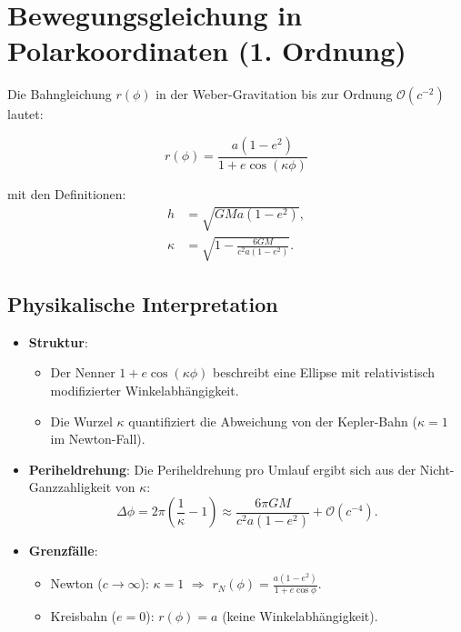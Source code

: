\newpage
\section{Bewegungsgleichung in Polarkoordinaten (1. Ordnung)}
Die Bahngleichung \(r(\phi)\) in der Weber-Gravitation bis zur Ordnung \(\mathcal{O}(c^{-2})\) lautet:

\begin{equation}
r(\phi) = \frac{a(1 - e^2)}{1 + e \cos\left(\kappa\phi\right)}
\end{equation}

\noindent mit den Definitionen:
\begin{align*}
h &= \sqrt{GMa(1 - e^2)}, \\
\kappa &= \sqrt{1 - \frac{6GM}{c^2a(1 - e^2)}}.
\end{align*}

\subsection*{Physikalische Interpretation}
\begin{itemize}
    \item \textbf{Struktur}: 
        \begin{itemize}
            \item Der Nenner \(1 + e \cos(\kappa\phi)\) beschreibt eine Ellipse mit relativistisch\\modifizierter Winkelabhängigkeit.
            \item Die Wurzel \(\kappa\) quantifiziert die Abweichung von der Kepler-Bahn (\(\kappa = 1\) im Newton-Fall).
        \end{itemize}
    \item \textbf{Periheldrehung}:
        Die Periheldrehung pro Umlauf ergibt sich aus der Nicht-Ganzzahligkeit von \(\kappa\):
        \[
        \Delta\phi = 2\pi\left(\frac{1}{\kappa} - 1\right) \approx \frac{6\pi GM}{c^2a(1 - e^2)} + \mathcal{O}(c^{-4}).
        \]
    \item \textbf{Grenzfälle}:
        \begin{itemize}
            \item Newton (\(c \to \infty\)): \(\kappa = 1\) \(\Rightarrow\) \(r_N(\phi) = \frac{a(1 - e^2)}{1 + e \cos\phi}\).
            \item Kreisbahn (\(e = 0\)): \(r(\phi) = a\) (keine Winkelabhängigkeit).
        \end{itemize}
\end{itemize}

